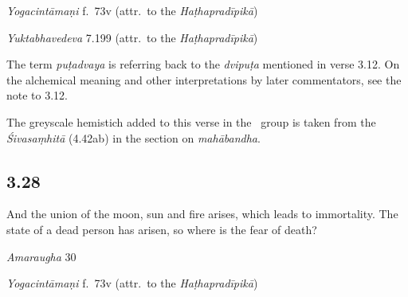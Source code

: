 \begin{ekdosis}
\begin{testimonia}[hp03_027]
\emph{Yogacintāmaṇi} f.~73v (attr.~to the \emph{Haṭhapradīpikā})
\begin{versinnote}
\end{versinnote}

\emph{Yuktabhavedeva} 7.199 (attr.~to the \emph{Haṭhapradīpikā})
\begin{versinnote}
\end{versinnote}
\end{testimonia}

\begin{philcomm}[hp03_027]
The term \emph{puṭadvaya} is referring back to the \emph{dvipuṭa} mentioned in verse 3.12. On the alchemical meaning and other interpretations by later commentators, see the note to 3.12.

The greyscale hemistich added to this verse in the \textgamma\ group is taken from the \emph{Śivasaṃhitā} (4.42ab) in the section on \emph{mahābandha}.
\end{philcomm}

\subsection*{3.28}
\begin{translation}[hp03_028]
And the union of the moon, sun and fire arises, which leads to immortality.
The state of a dead person has arisen, so where is the fear of death?
\end{translation}

\begin{sources}[hp03_028]
\emph{Amaraugha} 30
\begin{versinnote}
\tl{\var{°saṃbandhaṃ ] °saṃbandhāj, °saṃbandhā \vl}\\!}
\end{versinnote}
\end{sources}

\begin{testimonia}[hp03_028]
\emph{Yogacintāmaṇi} f.~73v (attr.~to the \emph{Haṭhapradīpikā})
\begin{versinnote}
\tl{\var{°samutpannaṃ ] °samutpannā \vl}\\!}
\end{versinnote}


\end{testimonia}
\end{ekdosis}

